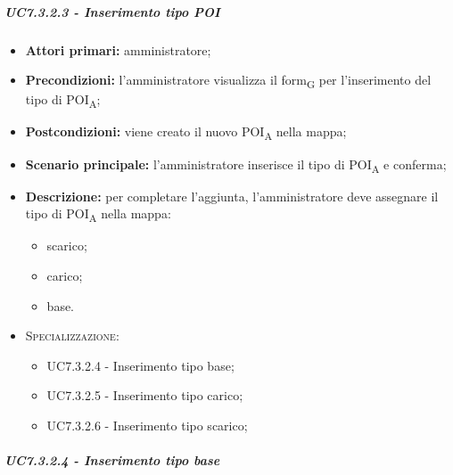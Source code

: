 \subparagraph{UC7.3.2.3 - Inserimento tipo POI}

\begin{itemize}

   \item   \textbf{Attori primari:} amministratore;

  \item   \textbf{Precondizioni:} l'amministratore visualizza il form\textsubscript{G} per l'inserimento del tipo di POI\textsubscript{A};

   \item   \textbf{Postcondizioni:} viene creato il nuovo POI\textsubscript{A} nella mappa; 

  \item   \textbf{Scenario principale:} l'amministratore inserisce il tipo di POI\textsubscript{A} e conferma;

   \item   \textbf{Descrizione:} per completare l'aggiunta, l'amministratore deve assegnare il tipo di POI\textsubscript{A} nella mappa:

  \begin{itemize}

       \item scarico;

       \item carico;

       \item base.
   \end{itemize}

   \item   \textsc{Specializzazione:}

   \begin{itemize}

       \item UC7.3.2.4 - Inserimento tipo base;

       \item UC7.3.2.5 - Inserimento tipo carico;

       \item UC7.3.2.6 - Inserimento tipo scarico;

   \end{itemize}



\end{itemize}



\subparagraph{UC7.3.2.4 - Inserimento tipo base}

